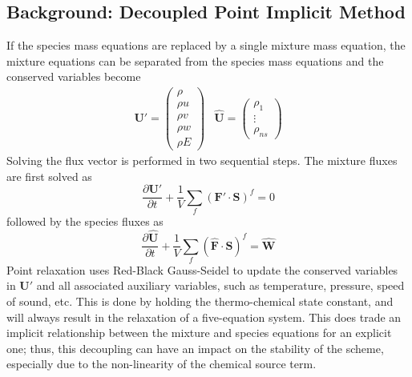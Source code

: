 \subsection{Background: Decoupled Point Implicit Method}

If the species mass equations are replaced by a single mixture mass equation,
the mixture equations can be separated from the species mass
equations and the conserved variables become
%
\begin{equation}
	\begin{matrix}
		\mathbf{U}'=\begin{pmatrix}
			\rho \\
			\rho u \\
			\rho v \\
			\rho w \\
			\rho E
		\end{pmatrix} &
		\mathbf{\hat{U}}=\begin{pmatrix}
			\rho_1 \\
			\vdots \\
			\rho_{ns}
		\end{pmatrix}
	\end{matrix}
\end{equation}
%
Solving the flux vector is performed in two sequential steps.  The mixture
fluxes are first solved as
%
\begin{equation} \frac{\partial \mathbf{{U}'}}{\partial t} +
  \frac{1}{V}\sum\limits_{f}(\mathbf{F}'\cdot\mathbf{S})^f = 0 \end{equation}
followed by the species fluxes as
%
\begin{equation} \frac{\partial \mathbf{\hat{U}}}{\partial t} +
  \frac{1}{V}\sum\limits_{f}(\mathbf{\hat{F}}\cdot\mathbf{S})^f =
  \mathbf{\hat{W}} \end{equation}
Point relaxation uses Red-Black Gauss-Seidel to update the conserved
variables in $\mathbf{U}'$ and all associated auxiliary variables, such as
temperature, pressure, speed of sound, etc.  This is done by holding the
thermo-chemical state constant, and will always result in the relaxation of a
five-equation system.  This does trade an implicit relationship between the mixture
and species equations for an explicit one; thus, this decoupling can have an
impact on the stability of the scheme, especially due to the non-linearity of
the chemical source term\cite{park}.
 
